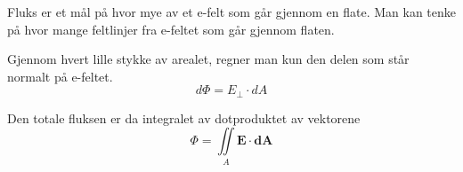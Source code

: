 Fluks er et mål på hvor mye av et e-felt som går gjennom en flate.
Man kan tenke på hvor mange feltlinjer fra e-feltet som går gjennom flaten.

Gjennom hvert lille stykke av arealet, regner man kun den delen som står
normalt på e-feltet.
$$d\Phi = E_\perp \cdot dA$$

Den totale fluksen er da integralet av dotproduktet av vektorene
$$\Phi = \iint\limits_A \mathbf{E} \cdot \mathbf{dA}$$
